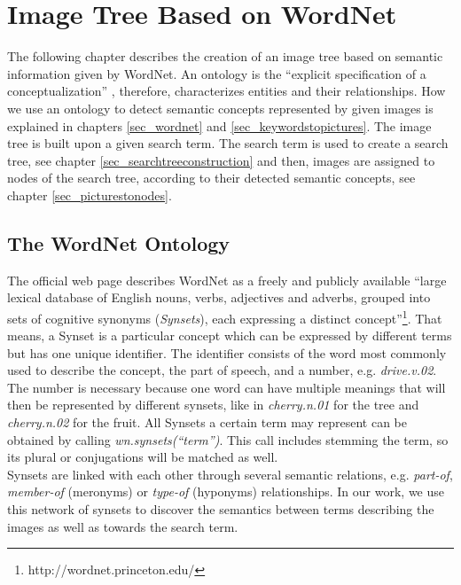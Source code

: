 %
\section{Image Tree Based on WordNet}
\label{sec_wordnetsearchtree}

The following chapter describes the creation of an image tree based on semantic information given by WordNet. An ontology is the ``explicit specification of a conceptualization'' \cite{gruber1995ontology}, therefore, characterizes entities and their relationships. How we use an ontology to detect semantic concepts represented by given images is explained in chapters \ref{sec_wordnet} and \ref{sec_keywordstopictures}. The image tree is built upon a given search term. The search term is used to create a search tree, see chapter \ref{sec_searchtreeconstruction} and then, images are assigned to nodes of the search tree, according to their detected semantic concepts, see chapter \ref{sec_picturestonodes}.

\subsection{The WordNet Ontology}
\label{sec_wordnet}
The official web page describes WordNet as a freely and publicly available ``large lexical database of English nouns, verbs, adjectives and adverbs, grouped into sets of cognitive synonyms (\emph{Synsets}), each expressing a distinct concept''\footnote{http://wordnet.princeton.edu/}. That means, a Synset is a particular concept which can be expressed by different terms but has one unique identifier. The identifier consists of the word most commonly used to describe the concept, the part of speech, and a number, e.g. \emph{drive.v.02}.\\
The number is necessary because one word can have multiple meanings that will then be represented by different synsets, like in \emph{cherry.n.01} for the tree and \emph{cherry.n.02} for the fruit. All Synsets a certain term may represent can be obtained by calling \emph{wn.synsets(``term'')}. This call includes stemming the term, so its plural or conjugations will be matched as well.\\

Synsets are linked with each other through several semantic relations, e.g. \emph{part-of}, \emph{member-of} (meronyms) or \emph{type-of} (hyponyms) relationships.
In our work, we use this network of synsets to discover the semantics between terms describing the images as well as towards the search term. \\

